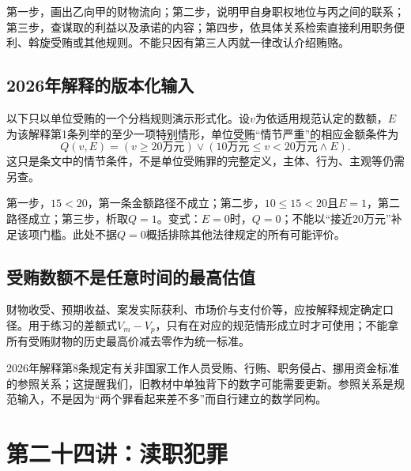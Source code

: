第一步，画出乙向甲的财物流向；第二步，说明甲自身职权地位与丙之间的联系；第三步，查谋取的利益以及承诺的内容；第四步，依具体关系检索直接利用职务便利、斡旋受贿或其他规则。不能只因有第三人丙就一律改认介绍贿赂。

\subsection{2026年解释的版本化输入}

以下只以单位受贿的一个分档规则演示形式化。设$v$为依适用规范认定的数额，$E$为该解释第1条列举的至少一项特别情形，单位受贿“情节严重”的相应金额条件为
\[
 Q(v,E)=(v\ge20\text{万元})
 \vee(10\text{万元}\le v<20\text{万元}\wedge E).
\]
这只是条文中的情节条件，不是单位受贿罪的完整定义，主体、行为、主观等仍需另查。

第一步，$15<20$，第一条金额路径不成立；第二步，$10\le15<20$且$E=1$，第二路径成立；第三步，析取$Q=1$。变式：$E=0$时，$Q=0$；不能以“接近20万元”补足该项门槛。此处不据$Q=0$概括排除其他法律规定的所有可能评价。

\subsection{受贿数额不是任意时间的最高估值}
财物收受、预期收益、案发实际获利、市场价与支付价等，应按解释规定确定口径。用于练习的差额式$V_m-V_p$，只有在对应的规范情形成立时才可使用；不能拿所有受贿财物的历史最高价减去零作为统一标准。

2026年解释第8条规定有关非国家工作人员受贿、行贿、职务侵占、挪用资金标准的参照关系；这提醒我们，旧教材中单独背下的数字可能需要更新。参照关系是规范输入，不是因为“两个罪看起来差不多”而自行建立的数学同构。


\section{第二十四讲：渎职犯罪}

